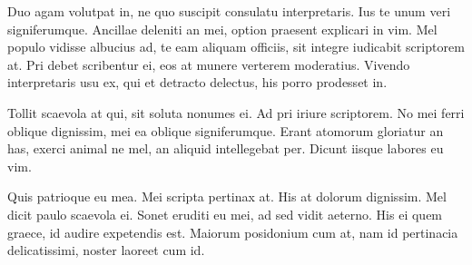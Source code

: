 \documentclass[%
 12pt,           %
 english,        %
 a4paper,        %
 DIV14,          %
 twoside,        %
 thesis,         %
 impberklaerung, %
]{hdprotokoll}
\begin{document}
Duo agam volutpat in, ne quo suscipit consulatu interpretaris. Ius te unum veri signiferumque. Ancillae deleniti an mei, option praesent explicari in vim. Mel populo vidisse albucius ad, te eam aliquam officiis, sit integre iudicabit scriptorem at. Pri debet scribentur ei, eos at munere verterem moderatius. Vivendo interpretaris usu ex, qui et detracto delectus, his porro prodesset in.

Tollit scaevola at qui, sit soluta nonumes ei. Ad pri iriure scriptorem. No mei ferri oblique dignissim, mei ea oblique signiferumque. Erant atomorum gloriatur an has, exerci animal ne mel, an aliquid intellegebat per. Dicunt iisque labores eu vim.

Quis patrioque eu mea. Mei scripta pertinax at. His at dolorum dignissim. Mel dicit paulo scaevola ei. Sonet eruditi eu mei, ad sed vidit aeterno. His ei quem graece, id audire expetendis est. Maiorum posidonium cum at, nam id pertinacia delicatissimi, noster laoreet cum id.

\printbibliography                %
\end{document}
